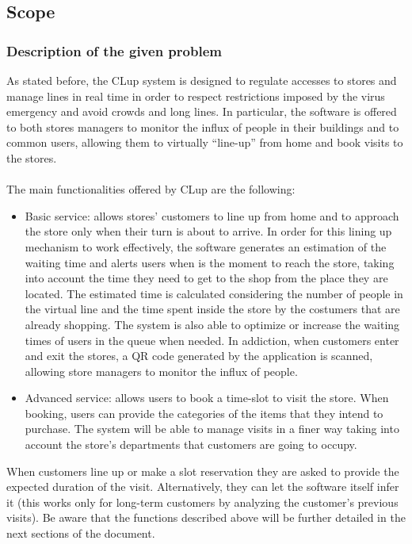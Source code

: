 \documentclass{article}
\begin{document}
\subsection{Scope}
\subsubsection{Description of the given problem}
As stated before, the CLup system is designed to regulate accesses to stores and manage lines in real time in order to respect restrictions imposed by the virus emergency and avoid crowds and long lines. In particular, the software is offered to both stores managers to monitor the influx of people in their buildings and to common users, allowing them to virtually “line-up” from home and book visits to the stores.\\
\smallskip\\
The main functionalities offered by CLup are the following:\\
\begin{itemize}
\item Basic service: allows stores' customers to line up from home and to approach the store only when their turn is about to arrive. In order for this lining up mechanism to work effectively, the software generates an estimation of the waiting time and alerts users when is the moment to reach the store, taking into account the time they need to get to the shop from the place they are located. The estimated time is calculated considering the number of people in the virtual line and the time spent inside the store by the costumers that are already shopping. The system is also able to optimize or increase the waiting times of users in the queue when needed. In addiction, when customers enter and exit the stores, a QR code generated by the application is scanned, allowing store managers to monitor the influx of people.
\item Advanced service: allows users to book a time-slot to visit the store. When booking, users can provide the categories of the items that they intend to purchase. The system will be able to manage visits in a finer way taking into account the store's departments that customers are going to occupy.
\end{itemize}
When customers line up or make a slot reservation they are asked to provide the expected duration of the visit. Alternatively, they can let the software itself infer it (this works only for long-term customers by analyzing the customer’s previous visits).
Be aware that the functions described above will be further detailed in the next sections of the document.
\end{document}
